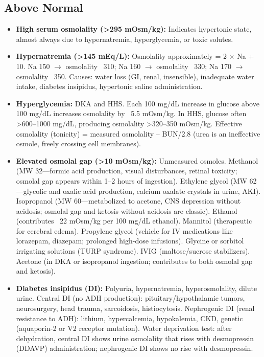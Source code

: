 \subsection*{Above Normal}
\begin{itemize}
  \item \textbf{High serum osmolality (>295 mOsm/kg):} Indicates hypertonic state, almost always due to hypernatremia, hyperglycemia, or toxic solutes.
  \item \textbf{Hypernatremia (>145 mEq/L):} Osmolality approximately = 2 $\times$ Na + 10. Na 150 $\rightarrow$ osmolality ~310; Na 160 $\rightarrow$ osmolality ~330; Na 170 $\rightarrow$ osmolality ~350. Causes: water loss (GI, renal, insensible), inadequate water intake, diabetes insipidus, hypertonic saline administration.
  \item \textbf{Hyperglycemia:} DKA and HHS. Each 100 mg/dL increase in glucose above 100 mg/dL increases osmolality by ~5.5 mOsm/kg. In HHS, glucose often >600--1000 mg/dL, producing osmolality >320--350 mOsm/kg. Effective osmolality (tonicity) = measured osmolality -- BUN/2.8 (urea is an ineffective osmole, freely crossing cell membranes).
  \item \textbf{Elevated osmolal gap (>10 mOsm/kg):} Unmeasured osmoles. Methanol (MW 32---formic acid production, visual disturbances, retinal toxicity; osmolal gap appears within 1--2 hours of ingestion). Ethylene glycol (MW 62---glycolic and oxalic acid production, calcium oxalate crystals in urine, AKI). Isopropanol (MW 60---metabolized to acetone, CNS depression without acidosis; osmolal gap and ketosis without acidosis are classic). Ethanol (contributes ~22 mOsm/kg per 100 mg/dL ethanol). Mannitol (therapeutic for cerebral edema). Propylene glycol (vehicle for IV medications like lorazepam, diazepam; prolonged high-dose infusions). Glycine or sorbitol irrigating solutions (TURP syndrome). IVIG (maltose/sucrose stabilizers). Acetone (in DKA or isopropanol ingestion; contributes to both osmolal gap and ketosis).
  \item \textbf{Diabetes insipidus (DI):} Polyuria, hypernatremia, hyperosmolality, dilute urine. Central DI (no ADH production): pituitary/hypothalamic tumors, neurosurgery, head trauma, sarcoidosis, histiocytosis. Nephrogenic DI (renal resistance to ADH): lithium, hypercalcemia, hypokalemia, CKD, genetic (aquaporin-2 or V2 receptor mutation). Water deprivation test: after dehydration, central DI shows urine osmolality that rises with desmopressin (DDAVP) administration; nephrogenic DI shows no rise with desmopressin.
\end{itemize}

